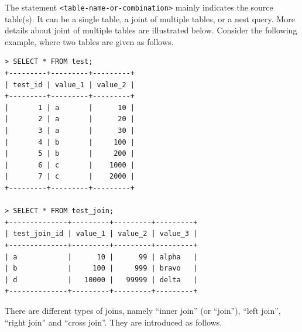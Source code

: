 The statement \verb|<table-name-or-combination>| mainly indicates the source table(s). It can be a single table, a joint of multiple tables, or a nest query. More details about joint of multiple tables are illustrated below. Consider the following example, where two tables are given as follows.
\begin{lstlisting}
> SELECT * FROM test;
+---------+---------+---------+
| test_id | value_1 | value_2 |
+---------+---------+---------+
|       1 | a       |      10 |
|       2 | a       |      20 |
|       3 | a       |      30 |
|       4 | b       |     100 |
|       5 | b       |     200 |
|       6 | c       |    1000 |
|       7 | c       |    2000 |
+---------+---------+---------+

> SELECT * FROM test_join;
+--------------+---------+---------+---------+
| test_join_id | value_1 | value_2 | value_3 |
+--------------+---------+---------+---------+
| a            |      10 |      99 | alpha   |
| b            |     100 |     999 | bravo   |
| d            |   10000 |   99999 | delta   |
+--------------+---------+---------+---------+
\end{lstlisting}

There are different types of joins, namely ``inner join'' (or ``join''), ``left join'', ``right join'' and ``cross join''. They are introduced as follows.

